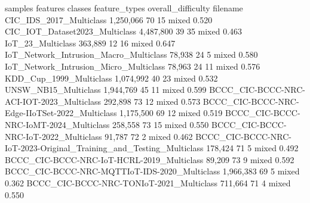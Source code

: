                                                                        samples features classes feature_types                          overall_difficulty
filename                                                                                                                                                 
CIC_IDS_2017_Multiclass                                              1,250,066       70      15         mixed   0.520
CIC_IOT_Dataset2023_Multiclass                                       4,487,800       39      35         mixed   0.463
IoT_23_Multiclass                                                      363,889       12      16         mixed   0.647
IoT_Network_Intrusion_Macro_Multiclass                                  78,938       24       5         mixed   0.580
IoT_Network_Intrusion_Micro_Multiclass                                  78,963       24      11         mixed   0.576
KDD_Cup_1999_Multiclass                                              1,074,992       40      23         mixed   0.532
UNSW_NB15_Multiclass                                                 1,944,769       45      11         mixed   0.599
BCCC_CIC-BCCC-NRC-ACI-IOT-2023_Multiclass                              292,898       73      12         mixed   0.573
BCCC_CIC-BCCC-NRC-Edge-IIoTSet-2022_Multiclass                       1,175,500       69      12         mixed   0.519
BCCC_CIC-BCCC-NRC-IoMT-2024_Multiclass                                 258,558       73      15         mixed   0.550
BCCC_CIC-BCCC-NRC-IoT-2022_Multiclass                                   91,787       72       2         mixed   0.462
BCCC_CIC-BCCC-NRC-IoT-2023-Original_Training_and_Testing_Multiclass    178,424       71       5         mixed   0.492
BCCC_CIC-BCCC-NRC-IoT-HCRL-2019_Multiclass                              89,209       73       9         mixed   0.592
BCCC_CIC-BCCC-NRC-MQTTIoT-IDS-2020_Multiclass                        1,966,383       69       5         mixed   0.362
BCCC_CIC-BCCC-NRC-TONIoT-2021_Multiclass                               711,664       71       4         mixed   0.550
